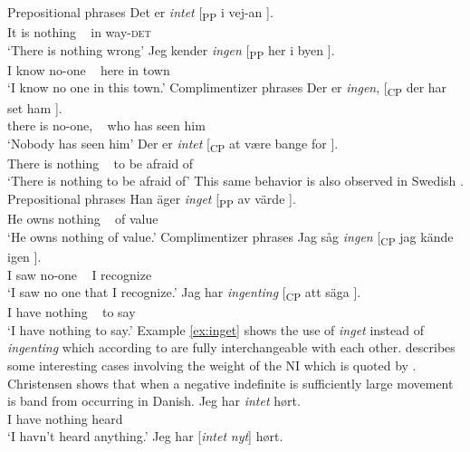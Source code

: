 \documentclass[12pt, letterpaper]{article}
\begin{document}
	\ea Prepositional phrases
		\ea 
		\gll Det er \textit{intet} [\textsubscript{PP} i vej-an ].\\
			It is nothing ~ in way-\textsc{det}\\
		\glt `There is nothing wrong'
		\ex 
		\gll Jeg kender \textit{ingen} [\textsubscript{PP} her i byen ].\\
			I know no-one ~ here in town\\
		\glt `I know no one in this town.'
		\z
	\ex Complimentizer phrases
		\ea 
		\gll Der er \textit{ingen}, [\textsubscript{CP} der har set ham ].\\
		there is no-one, ~ who has seen him\\
		\glt `Nobody has seen him'
		\ex
		\gll Der er \textit{intet} [\textsubscript{CP} at være bange for ].\\
		There is nothing ~ to be afraid of\\
		\glt `There is nothing to be afraid of'
		\z 
	\z
\ex This same behavior is also observed in Swedish \citep[197ff]{holmesSwedishComprehensiveGrammar2013}.
	\ea Prepositional phrases
		\ea \label{ex:inget}
		\gll Han äger \textit{inget} [\textsubscript{PP} av värde ].\\
			He owns nothing ~ of value\\
		\glt `He owns nothing of value.'
		\z 
	\ex Complimentizer phrases
		\ea
		\gll Jag såg \textit{ingen} [\textsubscript{CP} jag {kände igen} ].\\
		I saw no-one ~ I recognize\\
		\glt `I saw no one that I recognize.'
		\ex 
		\gll Jag har \textit{ingenting} [\textsubscript{CP} att säga ].\\
		I have nothing ~ to say\\
		\glt `I have nothing to say.'
		\z 
	\z
\ex Example \ref{ex:inget} shows the use of \textit{inget} instead of \textit{ingenting} which according to \citet{holmesSwedishComprehensiveGrammar2013} are fully interchangeable with each other.
\ex \citet[65f]{christensenInterfacesNegationSyntax2005} describes some interesting cases involving the weight of the NI which is quoted by \citet{penkaNegativeIndefinites2011}.
\ex Christensen shows that when a negative indefinite is sufficiently large movement is band from occurring in Danish.
	\ea
	\gll Jeg har \textit{intet} hørt.\\
	I have nothing heard\\
	\glt  `I havn't heard anything.'
	\ex 
	\gll Jeg har [\textit{intet} \textit{nyt}] hørt.\\
\end{document}
